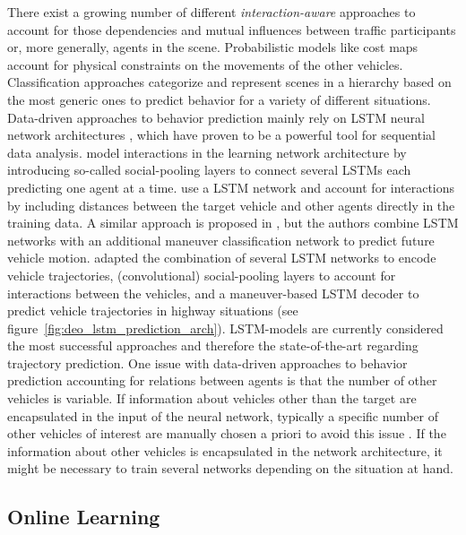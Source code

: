 There exist a growing number of different \emph{interaction-aware} approaches to account for those dependencies and mutual influences between traffic participants or, more generally, agents in the scene.
Probabilistic models like cost maps \parencite{Bahram2016} account for physical constraints on the movements of the other vehicles.
Classification approaches categorize and represent scenes in a hierarchy \parencite{Bonnin2012} based on the most generic ones to predict behavior for a variety of different situations.
Data-driven approaches to behavior prediction mainly rely on \ac{LSTM} neural network architectures \parencite{Hochreiter1997}, which have proven to be a powerful tool for sequential data analysis.
\textcite{Alahi2016} model interactions in the learning network architecture by introducing so-called social-pooling layers to connect several \acp{LSTM} each predicting one agent at a time.
\textcite{Altche2018} use a \ac{LSTM} network and account for interactions by including distances between the target vehicle and other agents directly in the training data.
A similar approach is proposed in \textcite{Deo2018}, but the authors combine \ac{LSTM} networks with an additional maneuver classification network to predict future vehicle motion.
\textcite{Deo2018a} adapted the combination of several \ac{LSTM} networks to encode vehicle trajectories, (convolutional) social-pooling layers to account for interactions between the vehicles, and a maneuver-based \ac{LSTM} decoder to predict vehicle trajectories in highway situations (see figure~\ref{fig:deo_lstm_prediction_arch}).
\ac{LSTM}-models are currently considered the most successful approaches and therefore the state-of-the-art regarding trajectory prediction.
One issue with data-driven approaches to behavior prediction accounting for relations between agents is that the number of other vehicles is variable.
If information about vehicles other than the target are encapsulated in the input of the neural network, typically a specific number of other vehicles of interest are manually chosen a priori to avoid this issue \parencite{Altche2018, Deo2018}.
If the information about other vehicles is encapsulated in the network architecture, it might be necessary to train several networks depending on the situation at hand.

\subsection{Online Learning}%
\label{subsec:online_learning}

